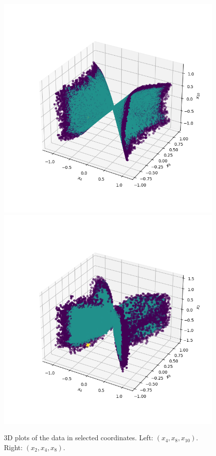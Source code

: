 \documentclass[11pt]{article}
\begin{document}
		\begin{figure}[h!]
			\centering
			\hspace{-2cm}
			\includegraphics[scale=0.5]{Figures/3d_plot_x4_x8_x10.png}
			\includegraphics[scale=0.5]{Figures/3d_plot_x2_x4_x8.png}
			\caption{3D plots of the data in selected coordinates. Left: $(x_4, x_8, x_{10})$. Right: $(x_2, x_4, x_8)$.}
			\label{3dplots}
		\end{figure}
\end{document}
